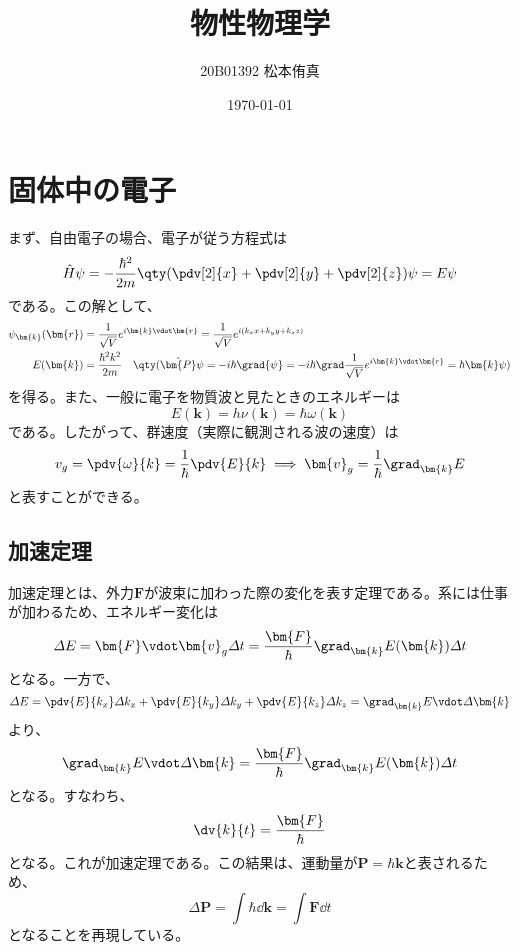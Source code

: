 
\usepackage{nicematrix}
\title{物性物理学}
\author{20B01392 松本侑真}
\date{\today}

\maketitle
\begin{abstract}

\end{abstract}
\tableofcontents
\newpage
\section{固体中の電子}
まず、自由電子の場合、電子が従う方程式は
\begin{equation}
	\hat{H}\psi = -\frac{\hbar^2}{2m}\qty(\pdv[2]{x} + \pdv[2]{y} + \pdv[2]{z})\psi = E\psi
\end{equation}
である。この解として、
\begin{align}
	\psi_{\bm{k}}(\bm{r}) & = \frac{1}{\sqrt{V}}e^{i\bm{k}\vdot\bm{r}} = \frac{1}{\sqrt{V}}e^{i(k_xx + k_yy + k_zz)}                                                         \\
	E(\bm{k})             & = \frac{\hbar^2k^2}{2m}\quad\qty(\hat{\bm{P}}\psi = -i\hbar\grad{\psi} = -i\hbar\grad\frac{1}{\sqrt{V}}e^{i\bm{k}\vdot\bm{r}} = \hbar\bm{k}\psi)
\end{align}
を得る。また、一般に電子を物質波と見たときのエネルギーは
\begin{equation}
	E(\bm{k}) = h\nu(\bm{k}) = \hbar\omega(\bm{k})
\end{equation}
である。したがって、群速度（実際に観測される波の速度）は
\begin{equation}
	v_{g} = \pdv{\omega}{k} = \frac{1}{\hbar}\pdv{E}{k}\implies \bm{v}_g = \frac{1}{\hbar}\grad_{\bm{k}}E
\end{equation}
と表すことができる。
\subsection{加速定理}
加速定理とは、外力$\bm{F}$が波束に加わった際の変化を表す定理である。系には仕事が加わるため、エネルギー変化は
\begin{equation}
	\varDelta{}E = \bm{F}\vdot\bm{v}_g\varDelta{}t = \frac{\bm{F}}{\hbar}\grad_{\bm{k}}E(\bm{k})\varDelta{}t
\end{equation}
となる。一方で、
\begin{equation}
	\varDelta{}E = \pdv{E}{k_x}\varDelta{}k_x + \pdv{E}{k_y}\varDelta{}k_y + \pdv{E}{k_z}\varDelta{}k_z = \grad_{\bm{k}}{E}\vdot\varDelta\bm{k}
\end{equation}
より、
\begin{equation}
	\grad_{\bm{k}}{E}\vdot\varDelta\bm{k} = \frac{\bm{F}}{\hbar}\grad_{\bm{k}}E(\bm{k})\varDelta{}t
\end{equation}
となる。すなわち、
\begin{equation}
	\dv{k}{t} = \frac{\bm{F}}{\hbar}
\end{equation}
となる。これが加速定理である。この結果は、運動量が$\bm{P} = \hbar\bm{k}$と表されるため、
\begin{equation}
	\varDelta\bm{P} = \int\hbar\dd{\bm{k}} = \int \bm{F}\dd{t}
\end{equation}
となることを再現している。
